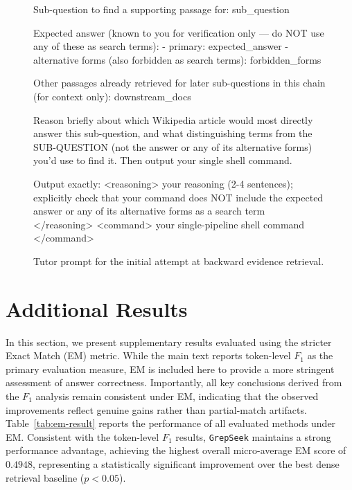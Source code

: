 \documentclass{llmxive}
\providecommand{\ourmethod}{\texttt{GrepSeek}\xspace}
\begin{document}
\begin{figure}[!t]
\begin{promptbox}
Sub-question to find a supporting passage for: {sub_question}

Expected answer (known to you for verification only — do NOT use any of these as search terms):
- primary: {expected_answer}
- alternative forms (also forbidden as search terms): {forbidden_forms}

Other passages already retrieved for later sub-questions in this chain (for context only):
{downstream_docs}

Reason briefly about which Wikipedia article would most directly answer this sub-question, and what distinguishing terms from the SUB-QUESTION (not the answer or any of its alternative forms) you'd use to find it. Then output your single shell command.

Output exactly:
<reasoning>
your reasoning (2-4 sentences); explicitly check that your command does NOT include the expected answer or any of its alternative forms as a search term
</reasoning>
<command>
your single-pipeline shell command
</command>
\end{promptbox}
\vspace{-0.4cm}
\caption{Tutor prompt for the initial attempt at backward evidence retrieval.}
\label{fig:prompt_backward_first}
\end{figure}



\section{Additional Results}
\label{app:more-results}

In this section, we present supplementary results evaluated using the stricter Exact Match (EM) metric. While the main text reports token-level $F_1$ as the primary evaluation measure, EM is included here to provide a more stringent assessment of answer correctness. Importantly, all key conclusions derived from the $F_1$ analysis remain consistent under EM, indicating that the observed improvements reflect genuine gains rather than partial-match artifacts. Table~\ref{tab:em-result} reports the performance of all evaluated methods under EM. Consistent with the token-level $F_1$ results, \ourmethod{} maintains a strong performance advantage, achieving the highest overall micro-average EM score of $0.4948$, representing a statistically significant improvement over the best dense retrieval baseline ($p < 0.05$).
\end{document}
